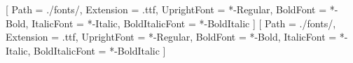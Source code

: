 \usepackage{marvosym} %
\usepackage{parskip} %


\usepackage{fontspec}
\setmainfont{Raleway}[
  Path           = ./fonts/,  %
  Extension      = .ttf,      %
  UprightFont    = *-Regular,
  BoldFont       = *-Bold,
  ItalicFont     = *-Italic,
  BoldItalicFont = *-BoldItalic
]
\setsansfont{Raleway}[
  Path           = ./fonts/,  %
  Extension      = .ttf,      %
  UprightFont    = *-Regular,
  BoldFont       = *-Bold,
  ItalicFont     = *-Italic,
  BoldItalicFont = *-BoldItalic
]


\usepackage{xeCJK} %




\usepackage{fancyhdr}

\pagestyle{fancy}
\fancyhf{}
\renewcommand{\headrulewidth}{0pt} %
\renewcommand{\footrulewidth}{0pt} %
\usepackage{lastpage} %


\usepackage{hyperref}
\usepackage{color}
\hypersetup{colorlinks,breaklinks,urlcolor=linkcolour, linkcolor=linkcolour}

